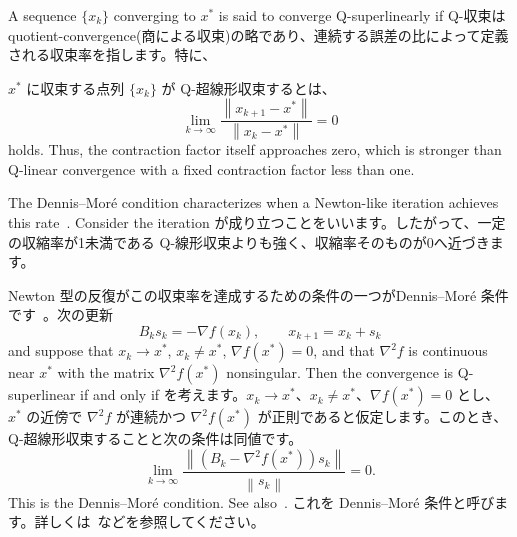 \documentclass[0_main]{subfiles}
\begin{document}
    A sequence $\{ x_k \}$ converging to $x^*$ is said to converge Q-superlinearly if
\else
    Q-収束は quotient-convergence(商による収束)の略であり、連続する誤差の比によって定義される収束率を指します。特に、

    $x^*$ に収束する点列 $\{ x_k \}$ が Q-超線形収束するとは、
\fi
\begin{equation*}
    \lim_{k\to\infty}\frac{\left\lVert x_{k+1}-x^*\right\rVert}{\left\lVert x_k-x^*\right\rVert}=0
\end{equation*}
\ifEn
    holds. Thus, the contraction factor itself approaches zero, which is stronger than Q-linear convergence with a fixed contraction factor less than one.

    The Dennis--Mor{\'e} condition characterizes when a Newton-like iteration achieves this rate~\citep{dennisCharacterizationSuperlinearConvergence1974,dennisjrQuasiNewtonMethodsMotivation1977}. Consider the iteration
\else
    が成り立つことをいいます。したがって、一定の収縮率が1未満である Q-線形収束よりも強く、収縮率そのものが0へ近づきます。

    Newton 型の反復がこの収束率を達成するための条件の一つがDennis--Mor{\'e} 条件です~\citep{dennisCharacterizationSuperlinearConvergence1974,dennisjrQuasiNewtonMethodsMotivation1977}。次の更新
\fi
\begin{equation*}
    B_k s_k=-\nabla f(x_k), \qquad x_{k+1}=x_k+s_k
\end{equation*}
\ifEn
    and suppose that $x_k\to x^*$, $x_k\neq x^*$, $\nabla f(x^*)=0$, and that $\nabla^2 f$ is continuous near $x^*$ with the matrix $\nabla^2 f(x^*)$ nonsingular. Then the convergence is Q-superlinear if and only if
\else
    を考えます。$x_k\to x^*$、$x_k\neq x^*$、$\nabla f(x^*)=0$ とし、$x^*$ の近傍で $\nabla^2 f$ が連続かつ $\nabla^2 f(x^*)$ が正則であると仮定します。このとき、Q-超線形収束することと次の条件は同値です。
\fi
\begin{equation}
    \lim_{k\to\infty}
    \frac{\left\lVert \left(B_k-\nabla^2 f(x^*)\right)s_k\right\rVert}
         {\left\lVert s_k\right\rVert}=0.
    \label{eq:dennis-more}
\end{equation}
\ifEn
    This is the Dennis--Mor{\'e} condition. See also~\citep{jinNonasymptoticGlobalConvergence2025}.
\else
    これを Dennis--Mor{\'e} 条件と呼びます。詳しくは~\citep{jinNonasymptoticGlobalConvergence2025}などを参照してください。
\fi

\ifSubfilesClassLoaded{
    
    
}{}
\end{document}
